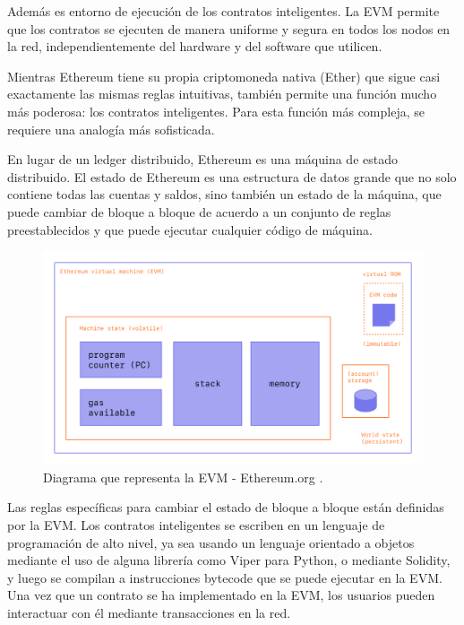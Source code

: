Además es entorno de ejecución de los contratos inteligentes. La EVM permite que los contratos se ejecuten de manera uniforme y segura en todos los nodos en la red, independientemente del hardware y del software que utilicen.

\bigskip

Mientras Ethereum tiene su propia criptomoneda nativa (Ether) que sigue casi exactamente las mismas reglas intuitivas, también permite una función mucho más poderosa: los contratos inteligentes. Para esta función más compleja, se requiere una analogía más sofisticada. 

\newpage

En lugar de un ledger distribuido\cite{dlt}, Ethereum es una máquina de estado distribuido. El estado de Ethereum es una estructura de datos grande que no solo contiene todas las cuentas y saldos, sino también un estado de la máquina, que puede cambiar de bloque a bloque de acuerdo a un conjunto de reglas preestablecidos y que puede ejecutar cualquier código de máquina. 

\begin{figure}[H]
    \centering
    \includegraphics[width=1\textwidth]{img/capturas/EVM.png}
    \caption{Diagrama que representa la EVM - Ethereum.org .}
    \label{fig:configApi}
\end{figure}

Las reglas específicas para cambiar el estado de bloque a bloque están definidas por la EVM. Los contratos inteligentes se escriben en un lenguaje de programación de alto nivel, ya sea usando un lenguaje orientado a objetos mediante el uso de alguna librería como Viper\cite{Vyper} para Python, o mediante Solidity\cite{soliditylang}, y luego se compilan a instrucciones bytecode que se puede ejecutar en la EVM. Una vez que un contrato se ha implementado en la EVM, los usuarios pueden interactuar con él mediante transacciones en la red.


